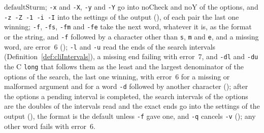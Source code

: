 \begin{definition}
  $\mathrm{defaultSturm}$; \verb|-x| and \verb|-X|, \verb|-y| and \verb|-Y| go into
  $\mathrm{noCheck}$ and $\mathrm{noY}$ of the options, and \verb|-z -Z -1 -i -I| into the settings
  of the output (), of each pair the last one winning; \verb|-f|,
  \verb|-fs|, \verb|-fm| and \verb|-fe| take the next word, whatever it is, as the format or the
  string, and \verb|-f| followed by a character other than \verb|s|, \verb|m| and \verb|e|, and a
  missing word, are error~6 (); \verb|-l| and \verb|-u| read the ends of
  the search intervals (Definition~\ref{def:cliIntervals}), a missing end failing with error~7, and
  \verb|-dl| and \verb|-du| the C \verb|long| that follows them as the least and the largest
  denominator of the options of the search, the last one winning, with error~6 for a missing or
  malformed argument and for a word \verb|-d| followed by another character
  (); after the options a pending interval is completed, the search
  intervals of the options are the doubles of the intervals read and the exact ends go into the
  settings of the output (), the format is the default unless \verb|-f|
  gave one, and \verb|-q| cancels \verb|-v| (); any other word fails with
  error~6.
\end{definition}

